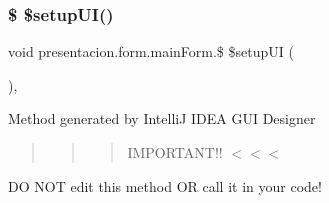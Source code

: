\subsubsection{\texorpdfstring{\$ \$setup\+U\+I()}{$ $setupUI()}}
{\footnotesize\ttfamily void presentacion.\+form.\+main\+Form.\$ \$setup\+UI (\begin{DoxyParamCaption}{ }\end{DoxyParamCaption})\hspace{0.3cm}{\ttfamily [inline]}, {\ttfamily [private]}}

Method generated by IntelliJ I\+D\+EA G\+UI Designer \begin{quote}
\begin{quote}
\begin{quote}
I\+M\+P\+O\+R\+T\+A\+N\+T!! $<$$<$$<$ \end{quote}
\end{quote}
\end{quote}
DO N\+OT edit this method OR call it in your code!

